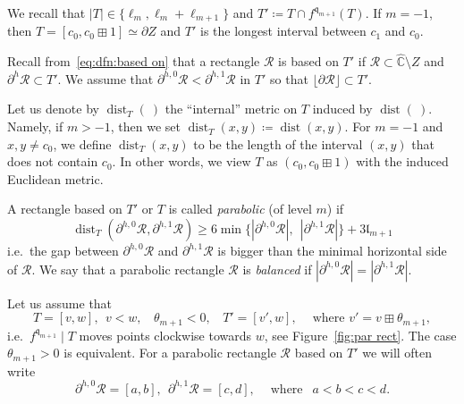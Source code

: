 \documentclass{amsart}
\renewcommand{\sp}{{\ \ }}
\newcommand{\1}{{\mathbb 1 }}
\newcommand\RR{\mathcal{R}}
\newcommand{\qq}{\mathfrak{q}}
\newcommand{\length}{{\mathfrak l}}
\newcommand{\wC}{\widehat{\mathbb{C}}}
\theoremstyle{remark}
\numberwithin{equation}{section}
\theoremstyle{definition}
\newcommand{\dist}{\operatorname{dist}}
\begin{document}
We recall that $|T|\in \{ \ell_m, \ell_m+\ell_{m+1}\}$ and $T'\coloneqq T\cap f^{\qq_{m+1}}(T)$. If $m=-1$, then $T=[c_0, c_0\boxplus 1]\simeq \partial Z$ and $T'$ is the longest interval between $c_1$ and $c_0$.



Recall from~\eqref{eq:dfn:based on} that a rectangle $\RR$ is based on $T'$ if $\RR\subset \wC\setminus Z$ and $\partial^h\RR\subset T'$.  We assume that $\partial ^{h,0}\RR< \partial ^{h,1}\RR$ in $T'$ so that $\lfloor \partial \RR \rfloor \subset T'$. 

Let us denote by $\dist_T(\ )$ the ``internal'' metric on $T$ induced by $\dist(\   )$. Namely, if $m>-1$, then we set $\dist_T(x,y)\coloneqq \dist(x,y)$. For $m=-1$ and $x,y\not= c_0$, we define $\dist_T(x,y)$ to be the length of the interval $(x,y)$ that does not contain $c_0$.  In other words, we view $T$ as $(c_0,c_0\boxplus 1)$ with the induced Euclidean metric.

 A rectangle based on $T'$ or $T$ is called \emph{parabolic} (of level $m$) if
\begin{equation}
\label{eq:parab rect}
\dist_{T}(\partial^{h,0}\RR,  \partial^{h,1}\RR ) \ge 6\min \{ | \partial^{h,0}\RR|,\sp | \partial^{h,1}\RR| \} +3\length_{m+1}
\end{equation}
i.e.~the gap between $ \partial^{h,0}\RR$ and $\partial^{h,1}\RR$ is bigger than the minimal horizontal side of $\RR.$ We say that a parabolic rectangle $\RR$ is \emph{balanced} if $|\partial^{h,0} \RR|=|\partial^{h,1} \RR|$. 

Let us assume that 
\begin{equation}
\label{eq:T:orientat ass} T=[v,w], \sp v<w,\sp\sp \theta_{m+1} <0,\sp\sp T'=[v',w],\sp\sp\text{ where }v'=v\boxplus \theta_{m+1},
\end{equation}
i.e.~$f^{\qq_{m+1}}\mid T$ moves points clockwise towards $w$, see Figure~\ref{fig:par rect}.  The case $\theta_{m+1}>0$ is equivalent. For a parabolic rectangle $\RR$ based on $T'$ we will often write
\begin{equation}
\label{eq:part RR:notat}
\partial^{h,0} \RR=[a,b],\sp \partial^{h,1} \RR=[c,d], \sp\sp\text{ where }\sp a<b<c<d.
\end{equation}
\end{document}
